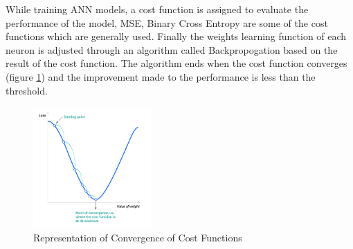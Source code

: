 \documentclass[twoside,11pt,a4paper]{article}
\begin{document}
While training \acs{ANN} models, a cost function is assigned to evaluate the performance of the model, \acf{MSE}, Binary Cross Entropy are some of the cost functions which are generally used. Finally the weights learning function of each neuron is adjusted through an algorithm called Backpropogation based on the result of the cost function. The algorithm ends when the cost function converges (figure \ref{fig:cost_function}) and the improvement made to the performance is less than the threshold.\\
\begin{figure}[ht]
	\centering
	\includegraphics[width=0.4\textwidth]{cost_function}
	\caption[Representation of Convergence of Cost Functions]{Representation of Convergence of Cost Functions\citep{ibm2022neural}}
	\label{fig:cost_function}
\end{figure}
\FloatBarrier
\end{document}
